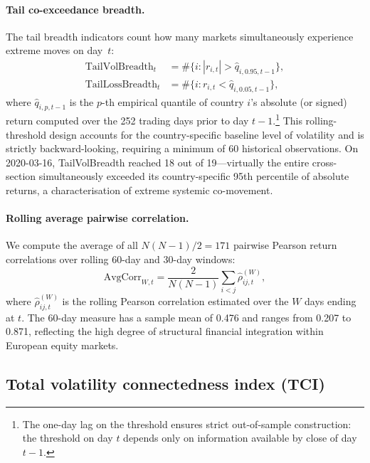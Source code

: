 \documentclass[11pt]{article}
\begin{document}
\paragraph{Tail co-exceedance breadth.}
The tail breadth indicators count how many markets simultaneously experience
extreme moves on day~$t$:
\begin{align}
  \text{TailVolBreadth}_t &= \#\{i : |r_{i,t}| > \hat{q}_{i,0.95,t-1}\}, \\
  \text{TailLossBreadth}_t &= \#\{i : r_{i,t} < \hat{q}_{i,0.05,t-1}\},
\end{align}
where $\hat{q}_{i,p,t-1}$ is the $p$-th empirical quantile of country $i$'s
absolute (or signed) return computed over the 252 trading days prior to day
$t-1$.\footnote{The one-day lag on the threshold ensures strict
out-of-sample construction: the threshold on day $t$ depends only on
information available by close of day $t-1$.}
This rolling-threshold design accounts for the country-specific baseline
level of volatility and is strictly backward-looking, requiring a minimum
of 60 historical observations.
On 2020-03-16, TailVolBreadth reached 18 out of 19---virtually the entire
cross-section simultaneously exceeded its country-specific 95th percentile
of absolute returns, a characterisation of extreme systemic co-movement.

\paragraph{Rolling average pairwise correlation.}
We compute the average of all $N(N-1)/2 = 171$ pairwise Pearson return
correlations over rolling 60-day and 30-day windows:
\begin{equation}
  \text{AvgCorr}_{W,t} = \frac{2}{N(N-1)} \sum_{i<j} \hat{\rho}_{ij,t}^{(W)},
\end{equation}
where $\hat{\rho}_{ij,t}^{(W)}$ is the rolling Pearson correlation estimated
over the $W$ days ending at $t$.
The 60-day measure has a sample mean of 0.476 and ranges from 0.207 to 0.871,
reflecting the high degree of structural financial integration within
European equity markets.

\subsection{Total volatility connectedness index (TCI)}
\label{subsec:tci}
\end{document}

